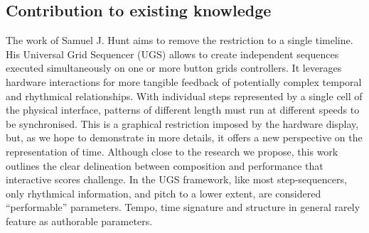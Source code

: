 \documentclass[journal,onecolumn]{IEEEtran}
\begin{document}
\subsection{Contribution to existing knowledge}
The work of Samuel J. Hunt \cite{hunt:poly} aims to remove the restriction to a single timeline. His Universal Grid Sequencer (UGS) allows to create independent sequences executed simultaneously on one or more button grids controllers. It leverages hardware interactions for more tangible feedback of potentially complex temporal and rhythmical relationships. 
With individual steps represented by a single cell of the physical interface, patterns of different length must run at different speeds to be synchronised. This is a graphical restriction imposed by the hardware display, but, as we hope to demonstrate in more details, it offers a new perspective on the representation of time. Although close to the research we propose, this work outlines the clear delineation between composition and performance that interactive scores challenge. In the UGS framework, like most step-sequencers, only rhythmical information, and pitch to a lower extent, are considered ``performable'' parameters. Tempo, time signature and structure in general rarely feature as authorable parameters. 

\end{document}
